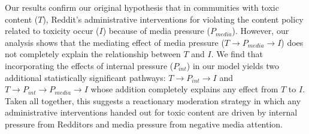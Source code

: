 Our results confirm our original hypothesis that in
communities with toxic content ($T$), Reddit's administrative interventions
for violating the content policy related to toxicity occur ($I$) because of
media pressure ($P_{media}$). However, our analysis shows that the mediating
effect of media pressure ($T \rightarrow P_{media} \rightarrow I$) does not
completely explain the relationship between $T$ and $I$. We find that
incorporating the effects of internal pressure ($P_{int}$) in our model yields
two additional statistically significant pathways: $T \rightarrow P_{int}
\rightarrow I$ and $T \rightarrow P_{int} \rightarrow P_{media} \rightarrow I$
whose addition completely explains any effect from $T$ to $I$. Taken all
together, this suggests a reactionary moderation strategy in which any
administrative interventions handed out for toxic content are driven by
internal pressure from Redditors and media pressure from negative media
attention.


